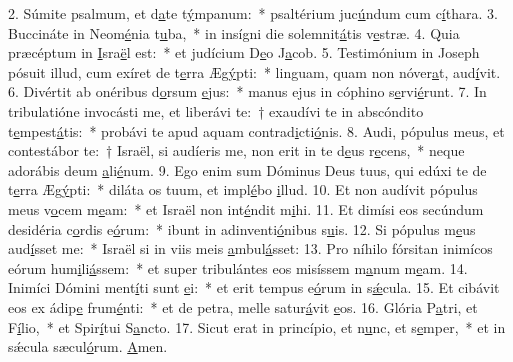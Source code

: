 2. Súmite psalmum, et d\uline{a}te t\uline{ý}mpanum:~* psaltérium juc\uline{ú}ndum cum c\uline{í}thara.
3. Buccináte in Neom\uline{é}nia t\uline{u}ba,~* in insígni die solemnit\uline{á}tis v\uline{e}stræ.
4. Quia præcéptum in \uline{I}sra\uline{ë}l est:~* et judícium D\uline{e}o J\uline{a}cob.
5. Testimónium in Joseph pósuit illud, cum exíret de t\uline{e}rra Æg\uline{ý}pti:~* linguam, quam non nóver\uline{a}t, aud\uline{í}vit.
6. Divértit ab onéribus d\uline{o}rsum \uline{e}jus:~* manus ejus in cóphino s\uline{e}rvi\uline{é}runt.
7. In tribulatióne invocásti me, et liberávi te:~† exaudívi te in abscóndito t\uline{e}mpest\uline{á}tis:~* probávi te apud aquam contrad\uline{i}cti\uline{ó}nis.
8. Audi, pópulus meus, et contestábor te:~† Israël, si audíeris me, non erit in te d\uline{e}us r\uline{e}cens,~* neque adorábis deum \uline{a}li\uline{é}num.
9. Ego enim sum Dóminus Deus tuus, qui edúxi te de t\uline{e}rra Æg\uline{ý}pti:~* diláta os tuum, et impl\uline{é}bo \uline{i}llud.
10. Et non audívit pópulus meus v\uline{o}cem m\uline{e}am:~* et Israël non int\uline{é}ndit m\uline{i}hi.
11. Et dimísi eos secúndum desidéria c\uline{o}rdis e\uline{ó}rum:~* ibunt in adinventi\uline{ó}nibus s\uline{u}is.
12. Si pópulus m\uline{e}us aud\uline{í}sset me:~* Israël si in viis meis \uline{a}mbul\uline{á}sset:
13. Pro níhilo fórsitan inimícos eórum hum\uline{i}li\uline{á}ssem:~* et super tribulántes eos misíssem m\uline{a}num m\uline{e}am.
14. Inimíci Dómini ment\uline{í}ti sunt \uline{e}i:~* et erit tempus e\uline{ó}rum in s\uline{ǽ}cula.
15. Et cibávit eos ex ádip\uline{e} frum\uline{é}nti:~* et de petra, melle satur\uline{á}vit \uline{e}os.
16. Glória P\uline{a}tri, et F\uline{í}lio,~* et Spir\uline{í}tui S\uline{a}ncto.
17. Sicut erat in princípio, et n\uline{u}nc, et s\uline{e}mper,~* et in sǽcula sæcul\uline{ó}rum. \uline{A}men.
